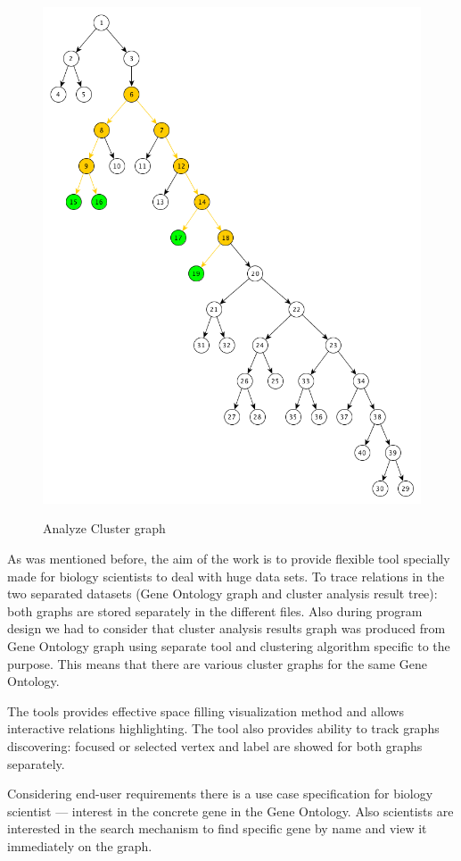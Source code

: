 \begin{figure}[h!]
{    \includegraphics[scale=0.23]{pictures/subgraph_extraction_algorithm_step_5.png}
}
\caption{Analyze Cluster graph}
\end{figure}


As was mentioned before, the aim of the work is to provide flexible tool specially made for biology scientists to deal with huge data sets.
To trace relations in the two separated datasets (Gene Ontology graph and cluster analysis result tree): both graphs are stored separately in the different files.
Also during program design we had to consider that cluster analysis results graph was produced from Gene Ontology graph using separate tool and clustering algorithm specific to the purpose.
This means that there are various cluster graphs for the same Gene Ontology.

The tools provides effective space filling visualization method and allows interactive relations highlighting.
The tool also provides ability to track graphs discovering: focused or selected vertex and label are showed for both graphs separately.

Considering end-user requirements there is a use case specification for biology scientist ---
interest in the concrete gene in the Gene Ontology. Also scientists are interested in the search mechanism to find specific gene by name and view it immediately on the graph.